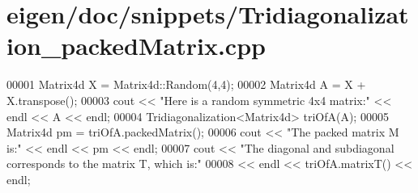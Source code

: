 \hypertarget{eigen_2doc_2snippets_2_tridiagonalization__packed_matrix_8cpp_source}{}\section{eigen/doc/snippets/\+Tridiagonalization\+\_\+packed\+Matrix.cpp}
\label{eigen_2doc_2snippets_2_tridiagonalization__packed_matrix_8cpp_source}

\begin{DoxyCode}
00001 Matrix4d X = Matrix4d::Random(4,4);
00002 Matrix4d A = X + X.transpose();
00003 cout << \textcolor{stringliteral}{"Here is a random symmetric 4x4 matrix:"} << endl << A << endl;
00004 Tridiagonalization<Matrix4d> triOfA(A);
00005 Matrix4d pm = triOfA.packedMatrix();
00006 cout << \textcolor{stringliteral}{"The packed matrix M is:"} << endl << pm << endl;
00007 cout << \textcolor{stringliteral}{"The diagonal and subdiagonal corresponds to the matrix T, which is:"} 
00008      << endl << triOfA.matrixT() << endl;
\end{DoxyCode}
